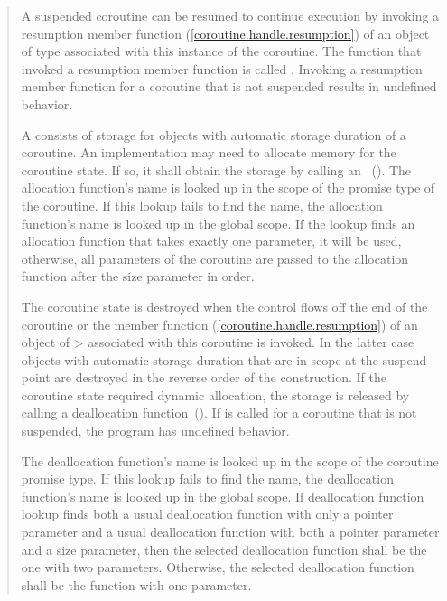 \begin{quote}
\pnum
A suspended coroutine can be resumed
to continue execution by invoking
a resumption member function (\ref{coroutine.handle.resumption}) of an object of type  
associated with this instance of the coroutine. The function that invoked a resumption member function is called . Invoking a resumption member function for a coroutine that is not suspended results in undefined behavior. 

\pnum
A  consists of 
storage for objects with automatic storage duration of a coroutine.
An implementation may need to allocate
memory for the coroutine state. If so, it shall obtain the storage by calling an
~().
The allocation function's name is looked up in the scope of the promise type of the coroutine. If this lookup fails to find the name, the allocation function's name is looked up in the global scope. If the lookup finds an allocation function that takes exactly one parameter, it will be used, otherwise, all parameters of the coroutine are passed to the allocation function after the size parameter in order.

\pnum
The coroutine state is destroyed when
the control flows off the end of the coroutine or
the  member function (\ref{coroutine.handle.resumption}) of an object of > associated with this coroutine is invoked. In the latter case objects with automatic storage duration that are in scope
at the suspend point are destroyed in the reverse order of the construction. If the coroutine state required dynamic allocation, the storage is released by calling a deallocation
function~(). If  is called for a coroutine that is not suspended, the program has undefined behavior.

\pnum
The deallocation function's name is looked up in the scope of the coroutine promise type. If this lookup fails to find the name, the deallocation function's name is looked up in the global scope. If deallocation function lookup finds both a usual deallocation function with only a pointer parameter and a usual deallocation function with both a pointer parameter and a size parameter, then the selected deallocation function shall be the one with two parameters. Otherwise, the selected deallocation function shall be the function with one parameter. 



\end{quote}
